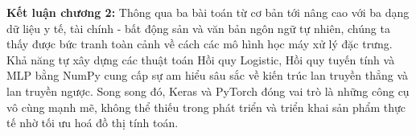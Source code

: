 \textbf{Kết luận chương 2:}
Thông qua ba bài toán từ cơ bản tới nâng cao với ba dạng dữ liệu y tế, tài chính - bất động sản và văn bản ngôn ngữ tự nhiên, chúng ta thấy được bức tranh toàn cảnh về cách các mô hình học máy xử lý đặc trưng. Khả năng tự xây dựng các thuật toán Hồi quy Logistic, Hồi quy tuyến tính và MLP bằng NumPy cung cấp sự am hiểu sâu sắc về kiến trúc lan truyền thẳng và lan truyền ngược. Song song đó, Keras và PyTorch đóng vai trò là những công cụ vô cùng mạnh mẽ, không thể thiếu trong phát triển và triển khai sản phẩm thực tế nhờ tối ưu hoá đồ thị tính toán.
